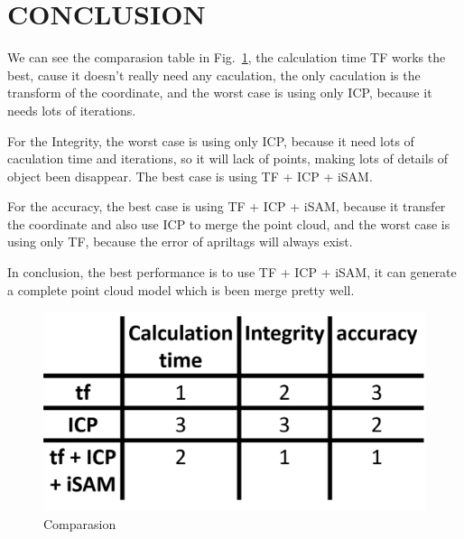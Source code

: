 \documentclass[letterpaper, 10 pt, conference]{ieeeconf}  %
\begin{document}
\section{CONCLUSION}

We can see the comparasion table in Fig.~\ref{figure:compare}, the calculation time TF works the best, cause it doesn't really need any caculation, the only caculation is the transform of the coordinate, and the worst case is using only ICP, because it needs lots of iterations. 

For the Integrity, the worst case is using only ICP, because it need lots of caculation time and iterations, so it will lack of points, making lots of details of object been disappear. The best case is using TF + ICP + iSAM.

For the accuracy, the best case is using TF + ICP + iSAM, because it transfer the coordinate and also use ICP to merge the point cloud, and the worst case is using only TF, because the error of apriltags will always exist.

In conclusion, the best performance is to use TF + ICP + iSAM, it can generate a complete point cloud model which is been merge pretty well.

\begin{figure}[h] %
\includegraphics[width=1\columnwidth]{compare}
\centering
\caption{Comparasion}
\label{figure:compare}
\end{figure}



\addtolength{\textheight}{-12cm}   %



\end{document}
